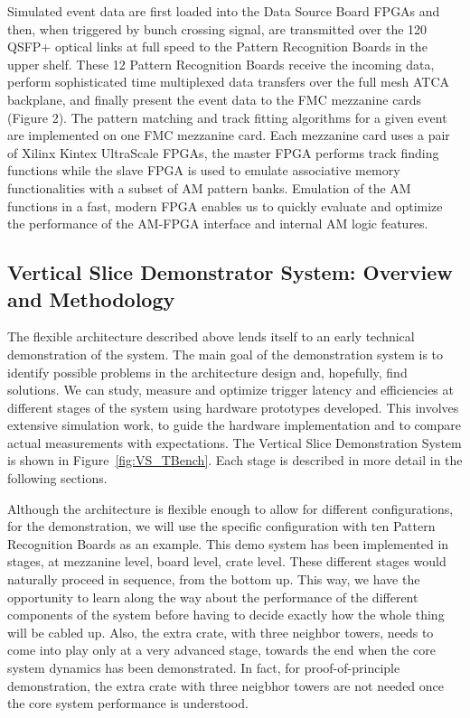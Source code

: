 Simulated event data are first loaded into the Data Source Board FPGAs and then, when triggered by bunch crossing signal, are transmitted over the 120 QSFP+ optical links at full speed to the Pattern Recognition Boards in the upper shelf.  These 12 Pattern Recognition Boards receive the incoming data, perform sophisticated time multiplexed data transfers over the full mesh ATCA backplane, and finally present the event data to the FMC mezzanine cards (Figure 2).  The pattern matching and track fitting algorithms for a given event are implemented on one FMC mezzanine card. Each mezzanine card uses a pair of Xilinx Kintex UltraScale FPGAs, the master FPGA performs track finding functions while the slave FPGA is used to emulate associative memory functionalities with a subset of AM pattern banks. Emulation of the AM functions in a fast, modern FPGA enables us to quickly evaluate and optimize the performance of the AM-FPGA interface and internal AM logic features.




\subsection{Vertical Slice Demonstrator System: Overview and Methodology}

\noindent The flexible architecture described above lends itself to an early technical demonstration of the system. The main goal of the demonstration system is to identify possible problems in the architecture design and, hopefully, find solutions. We can study, measure and optimize trigger latency and efficiencies at different stages of the system using hardware prototypes developed. This involves extensive simulation work, to guide the hardware implementation and to compare actual measurements with expectations. The Vertical Slice Demonstration System is shown in Figure~\ref{fig:VS_TBench}. Each stage is described in more detail in the following sections. 

Although the architecture is flexible enough to allow for different configurations, for the demonstration, we will use the specific configuration with ten Pattern Recognition Boards as an example. This demo system has been implemented in stages, at mezzanine level, board level, crate level. These different stages would naturally proceed in sequence, from the bottom up. This way, we have the opportunity to learn along the way about the performance of the different components of the system before having to decide exactly how the whole thing will be cabled up. Also, the extra crate, with three neighbor towers, needs to come into play only at a very advanced stage, towards the end when the core system dynamics has been demonstrated. In fact, for proof-of-principle demonstration, the extra crate with three neigbhor towers are not needed once the core system performance is understood. 

